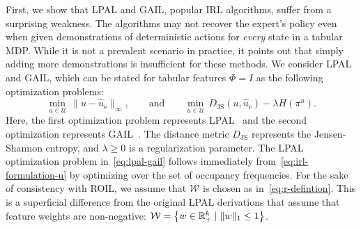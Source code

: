 \documentclass[10pt]{article}
\renewcommand{\cite}{\citep}
\theoremstyle{plain}
\theoremstyle{remark}
\begin{document}
First, we show that LPAL and GAIL, popular IRL algorithms, suffer from a surprising weakness. The algorithms may not recover the expert's policy even when given demonstrations of deterministic actions for \emph{every} state in a tabular MDP. While it is not a prevalent scenario in practice, it points out that simply adding more demonstrations is insufficient for these methods. We consider LPAL and GAIL, which can be stated for tabular features $\Phi = I$ as the following optimization problems:
\begin{equation} \label{eq:lpal-gail}
  \min_{u\in \mathcal{U}}\, \| u - \hat{u}_{\mathrm{e}} \|_{\infty},
  \qquad
  \text{and}
  \qquad
  \min_{u\in \mathcal{U}} \, D_{\mathrm{JS}}(u, \hat{u}_{\mathrm{e}}) - \lambda H(\pi^{u}).
\end{equation}
Here, the first optimization problem represents LPAL~\cite{Syed2008} and the second optimization represents GAIL~\cite[eq.~(15)]{Ho2016}. The distance metric $D_{\mathrm{JS}}$ represents the Jensen-Shannon entropy, and $\lambda \ge 0$ is a regularization parameter. The LPAL optimization problem in~\eqref{eq:lpal-gail} follows immediately from~\eqref{eq:irl-formulation-u} by optimizing over the set of occupancy frequencies. For the sake of consistency with ROIL, we assume that $\mathcal{W}$ is chosen as in~\eqref{eq:r-defintion}. This is a superficial difference from the original LPAL derivations that assume that feature weights are non-negative: $\mathcal{W} = \left\{ w\in \mathbb{R}^k_+ \mid \| w\|_1 \le  1  \right\}$.
\end{document}

